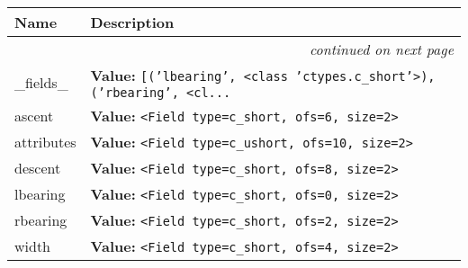     \vspace{-1cm}
\hspace{\varindent}\begin{longtable}{|p{\varnamewidth}|p{\vardescrwidth}|l}
\cline{1-2}
\cline{1-2} \centering \textbf{Name} & \centering \textbf{Description}& \\
\cline{1-2}
\endhead\cline{1-2}\multicolumn{3}{r}{\small\textit{continued on next page}}\\\endfoot\cline{1-2}
\endlastfoot\raggedright \_\-f\-i\-e\-l\-d\-s\-\_\- & \raggedright \textbf{Value:} 
{\tt \texttt{[}\texttt{(}\texttt{'}\texttt{lbearing}\texttt{'}\texttt{, }{\textless}class 'ctypes.c\_short'{\textgreater}\texttt{)}\texttt{, }\texttt{(}\texttt{'}\texttt{rbearing}\texttt{'}\texttt{, }{\textless}cl\texttt{...}}&\\
\cline{1-2}
\raggedright a\-s\-c\-e\-n\-t\- & \raggedright \textbf{Value:} 
{\tt {\textless}Field type=c\_short, ofs=6, size=2{\textgreater}}&\\
\cline{1-2}
\raggedright a\-t\-t\-r\-i\-b\-u\-t\-e\-s\- & \raggedright \textbf{Value:} 
{\tt {\textless}Field type=c\_ushort, ofs=10, size=2{\textgreater}}&\\
\cline{1-2}
\raggedright d\-e\-s\-c\-e\-n\-t\- & \raggedright \textbf{Value:} 
{\tt {\textless}Field type=c\_short, ofs=8, size=2{\textgreater}}&\\
\cline{1-2}
\raggedright l\-b\-e\-a\-r\-i\-n\-g\- & \raggedright \textbf{Value:} 
{\tt {\textless}Field type=c\_short, ofs=0, size=2{\textgreater}}&\\
\cline{1-2}
\raggedright r\-b\-e\-a\-r\-i\-n\-g\- & \raggedright \textbf{Value:} 
{\tt {\textless}Field type=c\_short, ofs=2, size=2{\textgreater}}&\\
\cline{1-2}
\raggedright w\-i\-d\-t\-h\- & \raggedright \textbf{Value:} 
{\tt {\textless}Field type=c\_short, ofs=4, size=2{\textgreater}}&\\
\cline{1-2}
\end{longtable}



